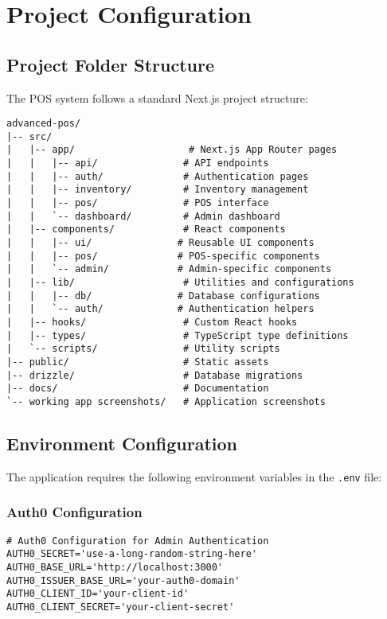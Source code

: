 \appendix
\chapter{Project Configuration}

\section{Project Folder Structure}

The POS system follows a standard Next.js project structure:

\begin{verbatim}
advanced-pos/
|-- src/
|   |-- app/                    # Next.js App Router pages
|   |   |-- api/               # API endpoints
|   |   |-- auth/              # Authentication pages
|   |   |-- inventory/         # Inventory management
|   |   |-- pos/               # POS interface
|   |   `-- dashboard/         # Admin dashboard
|   |-- components/            # React components
|   |   |-- ui/               # Reusable UI components
|   |   |-- pos/              # POS-specific components
|   |   `-- admin/            # Admin-specific components
|   |-- lib/                   # Utilities and configurations
|   |   |-- db/               # Database configurations
|   |   `-- auth/             # Authentication helpers
|   |-- hooks/                 # Custom React hooks
|   |-- types/                 # TypeScript type definitions
|   `-- scripts/               # Utility scripts
|-- public/                    # Static assets
|-- drizzle/                   # Database migrations
|-- docs/                      # Documentation
`-- working app screenshots/   # Application screenshots
\end{verbatim}

\section{Environment Configuration}

The application requires the following environment variables in the \texttt{.env} file:

\subsection{Auth0 Configuration}
\begin{verbatim}
# Auth0 Configuration for Admin Authentication
AUTH0_SECRET='use-a-long-random-string-here'
AUTH0_BASE_URL='http://localhost:3000'
AUTH0_ISSUER_BASE_URL='your-auth0-domain'
AUTH0_CLIENT_ID='your-client-id'
AUTH0_CLIENT_SECRET='your-client-secret'
\end{verbatim}

